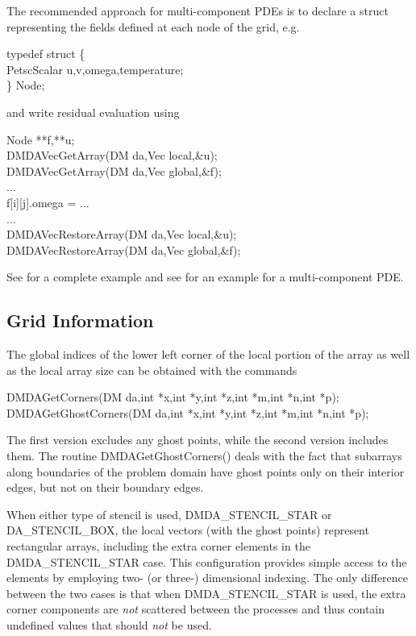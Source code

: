 The recommended approach for multi-component PDEs is to declare a struct representing the fields defined at each node of the grid, e.g.
\begin{tabbing}
  typedef struct \{ \\
    PetscScalar u,v,omega,temperature; \\
  \} Node;
\end{tabbing}
and write residual evaluation using
\begin{tabbing}
  Node **f,**u;\\
  DMDAVecGetArray(DM da,Vec local,\&u);\\
  DMDAVecGetArray(DM da,Vec global,\&f);\\
   ...\\
      f[i][j].omega = ...\\
   ...\\
  DMDAVecRestoreArray(DM da,Vec local,\&u);\\
  DMDAVecRestoreArray(DM da,Vec global,\&f);
\end{tabbing}
See  for a
complete example and see  for an
example for a multi-component PDE.

\subsection{Grid Information}

The global indices of the lower left corner of the local portion of the array
as well as the local array size can be obtained with the commands
\begin{tabbing}
  DMDAGetCorners(DM da,int *x,int *y,int *z,int *m,int *n,int *p);\\
  DMDAGetGhostCorners(DM da,int *x,int *y,int *z,int *m,int *n,int *p);
\end{tabbing}
The first version excludes any ghost points, while the second version
includes them.
The routine DMDAGetGhostCorners()
deals with the fact that subarrays along boundaries of the problem
domain have ghost points only on their interior edges, but not on
their boundary edges.

When either type of stencil is used, DMDA\_STENCIL\_STAR or
DA\_STENCIL\_BOX, the local vectors (with the ghost points)
represent rectangular arrays, including the extra corner elements in
the DMDA\_STENCIL\_STAR case. This configuration provides simple
access to the elements by employing two- (or three-) dimensional indexing.
The only difference between the
two cases is that when DMDA\_STENCIL\_STAR is used, the extra
corner components are {\em not} scattered between the processes and thus
contain undefined values that should {\em not} be used.

